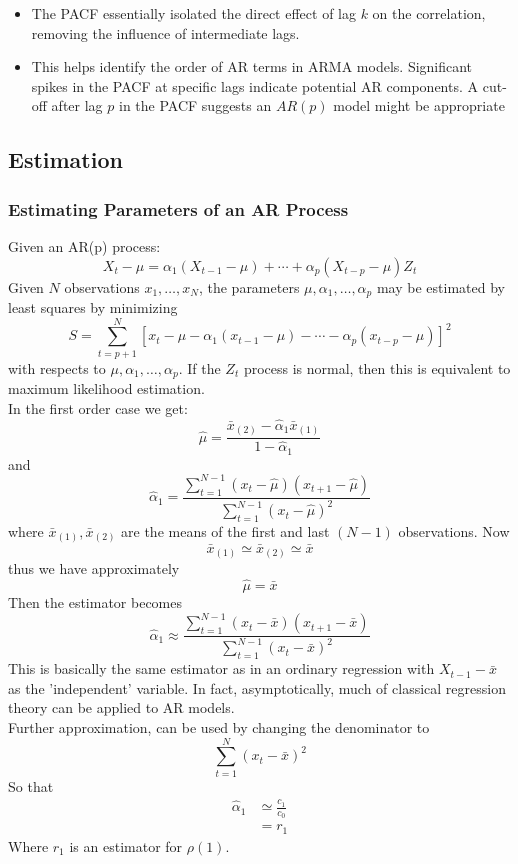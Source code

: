 \begin{itemize}
    \item The PACF essentially isolated the direct effect of lag $k$ on the correlation, removing the influence of intermediate lags.
    \item This helps identify the order of AR terms in ARMA models. Significant spikes in the PACF at specific lags indicate potential AR components. A cut-off after lag $p$ in the PACF suggests an $AR(p)$ model might be appropriate
\end{itemize}

\subsection{Estimation}

\subsubsection{Estimating Parameters of an AR Process}

Given an AR(p) process: \[
X_t -\mu = \alpha_1(X_{t-1}-\mu) + \cdots + \alpha_p (X_{t-p} -\mu) Z_t
\] Given $N$ observations $x_1, \ldots, x_N$, the parameters $\mu, \alpha_1, \ldots, \alpha_p$ may be estimated by least squares by minimizing\[
S = \sum_{t=p+1}^N \left[x_t-\mu-\alpha_1(x_{t-1}-\mu) - \cdots - \alpha_p (x_{t-p}-\mu) \right]^2
\] with respects to $\mu, \alpha_1, \ldots, \alpha_p$. If the $Z_t$ process is normal, then this is equivalent to maximum likelihood estimation. \\

In the first order case we get: \[
\hat{\mu} = \frac{\bar{x}_{(2)} - \hat{\alpha}_1 \bar{x}_{(1)}}{1-\hat{\alpha}_1}
\] and \[
\hat{\alpha}_1 = \frac{\sum_{t=1}^{N-1} (x_t-\hat{\mu})(x_{t+1}-\hat{\mu}) }{\sum_{t=1}^{N-1} (x_t- \hat{\mu})^2}
\] where $\bar{x}_{(1)},\bar{x}_{(2)} $ are the means of the first and last $(N-1)$ observations. Now \[ 
\bar{x}_{(1)} \simeq \bar{x}_{(2)} \simeq \bar{x}
\] thus we have approximately \[
\hat{\mu} = \bar{x}
\] Then the estimator becomes \[
\hat{\alpha}_1 \approx \frac{\sum_{t=1}^{N-1} (x_t-\bar{x})(x_{t+1}-\bar{x}) }{\sum_{t=1}^{N-1} (x_t- \bar{x})^2}
\]
This is basically the same estimator as in an ordinary regression with $X_{t-1}-\bar{x}$ as the 'independent' variable. In fact, asymptotically, much of classical regression theory can be applied to AR models. \\
Further approximation, can be used by changing the denominator to \[\sum_{t=1}^N(x_t-\bar{x})^2\] So that \begin{align*}
    \hat{{\alpha}}_1 &\simeq \frac{c_1}{c_0}\\
    &= r_1
\end{align*} Where $r_1$ is an estimator for $\rho(1)$. \\

